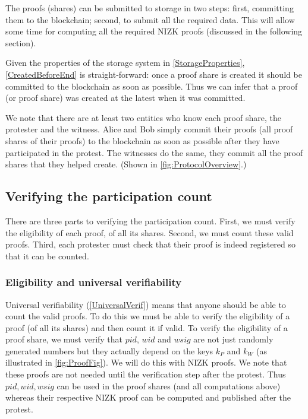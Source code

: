 The proofs (shares) can be submitted to storage in two steps:
first, committing them to the blockchain; second, to submit all the required 
data.
This will allow some time for computing all the required \ac{NIZK} proofs 
(discussed in the following section).

Given the properties of the storage system in \cref{StorageProperties}, 
\cref{CreatedBeforeEnd} is straight-forward: once a proof share is created it 
should be committed to the blockchain as soon as possible.
Thus we can infer that a proof (or proof share) was created at the latest when 
it was committed.

We note that there are at least two entities who know each proof share, the 
protester and the witness.
Alice and Bob simply commit their proofs (\ie all proof shares of their 
proofs) to the blockchain as soon as possible after they have participated in 
the protest.
The witnesses do the same, they commit all the proof shares that they helped 
create.
(Shown in \cref{fig:ProtocolOverview}.)

\subsection{Verifying the participation count}

There are three parts to verifying the participation count.
First, we must verify the eligibility of each proof, \ie of all its shares.
Second, we must count these valid proofs.
Third, each protester must check that their proof is indeed registered so that 
it can be counted.

\subsubsection{Eligibility and universal verifiability}

Universal verifiability (\cref{UniversalVerif}) means that anyone should be able 
to count the valid proofs.
To do this we must be able to verify the eligibility of a proof (\ie of all 
its shares) and then count it if valid.
To verify the eligibility of a proof share, we must verify that \(pid\), \(wid\) 
and \(wsig\) are not just randomly generated numbers but they actually depend on 
the keys \(k_P\) and \(k_W\) (as illustrated in \cref{fig:ProofFig}).
We will do this with \ac{NIZK} proofs.
We note that these proofs are not needed until the verification step after the 
protest.
Thus \(pid, wid, wsig\) can be used in the proof shares (and all computations 
above) whereas their respective \ac{NIZK} proof can be computed and published 
after the protest.

